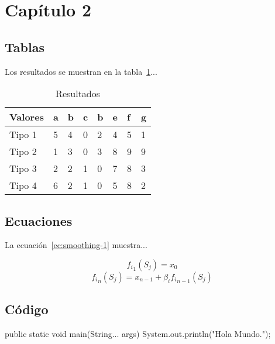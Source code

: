 \section{Capítulo 2}

\subsection{Tablas}

Los resultados se muestran en la tabla~\ref{table:resultados}...

\begin{table}[H]
    \begin{center}
        \caption{Resultados\label{table:resultados}}
        \begin{tabular}{|l|l|l|l|l|l|l|l|}
            \hline
            Valores    & a & b & c & b & e  & f & g \\
            \hline
            Tipo 1     & 5 & 4 & 0 & 2 &  4 & 5 &  1  \\
            Tipo 2     & 1 & 3 & 0 & 3 &  8 & 9 &  9  \\
            Tipo 3     & 2 & 2 & 1 & 0 &  7 & 8 &  3  \\
            Tipo 4     & 6 & 2 & 1 & 0 &  5 & 8 &  2  \\
            \hline
        \end{tabular}
    \end{center}
\end{table}

\subsection{Ecuaciones}

La ecuación~\ref{ec:smoothing-1} muestra...

\begin{equation} \label{ec:smoothing-1}
 {f_i}_1 (S_j) = x_{0}
\end{equation} 
\begin{equation} \label{ec:smoothing-2}
 {f_i}_n (S_j) =  x_{n-1} + \beta_i {f_i}_{n-1} (S_j)
\end{equation} 

\subsection{Código}

\begin{codigojava}
public static void main(String... args) {
    System.out.println("Hola Mundo.");
}
\end{codigojava}

